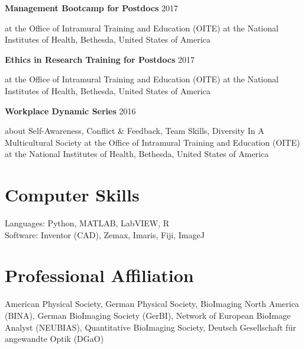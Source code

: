 \documentclass[margin,line]{res}
\begin{document}
\begin{resume}
\vspace*{-2mm}

{\bf Management Bootcamp for Postdocs} \hfill {2017}\\
\vspace*{-3.5mm}
\begin{addmargin}[0pt]{.1\linewidth}
\vspace*{-1mm}
at the Office of Intramural Training and Education (OITE) at the National Institutes of Health, Bethesda, United States of America
\end{addmargin}

\vspace*{-2mm}

{\bf Ethics in Research Training for Postdocs} \hfill {2017}\\
\vspace*{-3.5mm}
\begin{addmargin}[0pt]{.1\linewidth}
\vspace*{-1mm}
at the Office of Intramural Training and Education (OITE) at the National Institutes of Health, Bethesda, United States of America
\end{addmargin}

\vspace*{-2mm}

{\bf Workplace Dynamic Series} \hfill {2016}\\
\vspace*{-3.5mm}
\begin{addmargin}[0pt]{.1\linewidth}
\vspace*{-1mm}
about Self-Awareness, Conflict \& Feedback, Team Skills, Diversity In A Multicultural Society at the Office of Intramural Training and Education (OITE) at the National Institutes of Health, Bethesda, United States of America
\end{addmargin}


\section{\sc Computer Skills} 

Languages:  Python, MATLAB, LabVIEW, R\\ %
Software: Inventor (CAD), Zemax, Imaris, Fiji, ImageJ


\section{\sc Professional Affiliation} 
American Physical Society, German Physical Society, BioImaging North America (BINA), German BioImaging Society (GerBI), Network of European BioImage Analyst (NEUBIAS), Quantitative BioImaging Society, Deutsch Gesellschaft für angewandte Optik (DGaO)


\end{resume}
\end{document}
